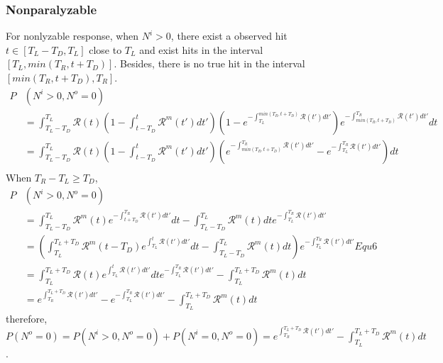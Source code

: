 \subsubsection{Nonparalyzable}
For nonlyzable response, when $N^i>0$, there exist a observed hit $t\in[T_L-T_D,T_L]$ close to $T_L$ and exist hits in the interval $[T_L, min(T_R,t+T_D)]$. Besides, there is no true hit in the interval $[min(T_R,t+T_D),T_R]$.
\begin{equation}
\begin{aligned}
P&(N^i>0,N^o=0)\\
&=\int_{T_L-T_D}^{T_L}{\mathcal{R}(t)\left(1-\int_{t-T_D}^{t}{\mathcal{R}^m(t')dt'}\right)\left(1-e^{-\int_{T_L}^{min(T_R,t+T_D)}{\mathcal{R}(t')dt'}}\right)e^{-\int_{min(T_R,t+T_D)}^{T_R}{\mathcal{R}(t')dt'}}dt}\\
&=\int_{T_L-T_D}^{T_L}{\mathcal{R}(t)\left(1-\int_{t-T_D}^{t}{\mathcal{R}^m(t')dt'}\right)\left(e^{-\int_{min(T_R,t+T_D)}^{T_R}{\mathcal{R}(t')dt'}}-e^{-\int_{T_L}^{T_R}{\mathcal{R}(t')dt'}}\right)dt}\\
\end{aligned}
\end{equation}
When $T_R-T_L\geq T_D$,
\begin{equation}
\begin{aligned}
P&(N^i>0,N^o=0)\\
&=\int_{T_L-T_D}^{T_L}{\mathcal{R}^m(t)e^{-\int_{t+T_D}^{T_R}{\mathcal{R}(t')dt'}}dt}-\int_{T_L-T_D}^{T_L}{\mathcal{R}^m(t)dt}e^{-\int_{T_L}^{T_R}{\mathcal{R}(t')dt'}}\\
&=\left(\int_{T_L}^{T_L+T_D}{\mathcal{R}^m(t-T_D)e^{\int_{T_L}^{t}{\mathcal{R}(t')dt'}}dt}-\int_{T_L-T_D}^{T_L}{\mathcal{R}^m(t)dt}\right)e^{-\int_{T_L}^{T_R}{\mathcal{R}(t')dt'}} Equ6\\
&=\int_{T_L}^{T_L+T_D}{\mathcal{R}(t)e^{\int_{T_L}^{t}{\mathcal{R}(t')dt'}}dt}e^{-\int_{T_L}^{T_R}{\mathcal{R}(t')dt'}} -\int_{T_L}^{T_L+T_D}{\mathcal{R}^m(t)dt}\\
&= e^{\int_{T_R}^{T_L+T_D}{\mathcal{R}(t')dt'}} - e^{-\int_{T_L}^{T_R}{\mathcal{R}(t')dt'}}-\int_{T_L}^{T_L+T_D}{\mathcal{R}^m(t)dt}
\end{aligned}
\end{equation}
therefore, $P(N^o=0)=P(N^i>0,N^o=0)+P(N^i=0,N^o=0)=e^{\int_{T_R}^{T_L+T_D}{\mathcal{R}(t')dt'}}-\int_{T_L}^{T_L+T_D}{\mathcal{R}^m(t)dt}$.

